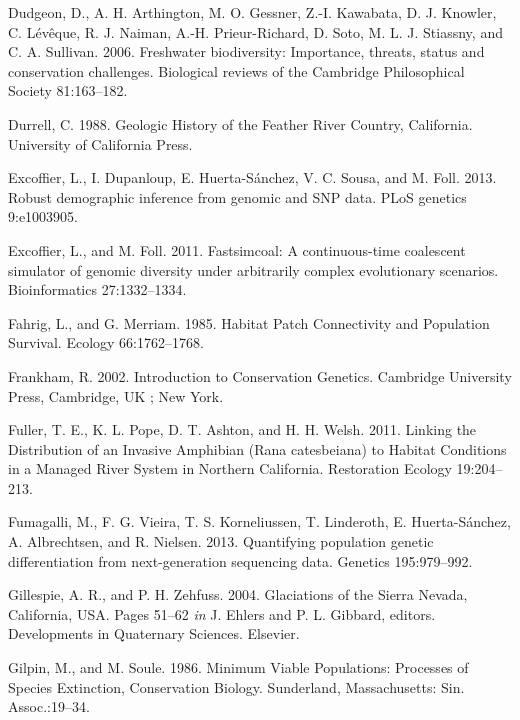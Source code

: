 \documentclass[proquest,12pt,final]{ucthesis-CA2012} %
\begin{document}
\begin{ucmainmatter}
\leavevmode\hypertarget{ref-dudgeon_freshwater_2006}{}%
Dudgeon, D., A. H. Arthington, M. O. Gessner, Z.-I. Kawabata, D. J.
Knowler, C. Lévêque, R. J. Naiman, A.-H. Prieur-Richard, D. Soto, M. L.
J. Stiassny, and C. A. Sullivan. 2006. Freshwater biodiversity:
Importance, threats, status and conservation challenges. Biological
reviews of the Cambridge Philosophical Society 81:163--182.

\leavevmode\hypertarget{ref-durrell_geologic_1988}{}%
Durrell, C. 1988. Geologic History of the Feather River Country,
California. University of California Press.

\leavevmode\hypertarget{ref-excoffier_robust_2013}{}%
Excoffier, L., I. Dupanloup, E. Huerta-Sánchez, V. C. Sousa, and M.
Foll. 2013. Robust demographic inference from genomic and SNP data. PLoS
genetics 9:e1003905.

\leavevmode\hypertarget{ref-excoffier_fastsimcoal_2011}{}%
Excoffier, L., and M. Foll. 2011. Fastsimcoal: A continuous-time
coalescent simulator of genomic diversity under arbitrarily complex
evolutionary scenarios. Bioinformatics 27:1332--1334.

\leavevmode\hypertarget{ref-fahrig_habitat_1985}{}%
Fahrig, L., and G. Merriam. 1985. Habitat Patch Connectivity and
Population Survival. Ecology 66:1762--1768.

\leavevmode\hypertarget{ref-frankham_introduction_2002}{}%
Frankham, R. 2002. Introduction to Conservation Genetics. Cambridge
University Press, Cambridge, UK ; New York.

\leavevmode\hypertarget{ref-fuller_linking_2011}{}%
Fuller, T. E., K. L. Pope, D. T. Ashton, and H. H. Welsh. 2011. Linking
the Distribution of an Invasive Amphibian (Rana catesbeiana) to Habitat
Conditions in a Managed River System in Northern California. Restoration
Ecology 19:204--213.

\leavevmode\hypertarget{ref-fumagalli_quantifying_2013}{}%
Fumagalli, M., F. G. Vieira, T. S. Korneliussen, T. Linderoth, E.
Huerta-Sánchez, A. Albrechtsen, and R. Nielsen. 2013. Quantifying
population genetic differentiation from next-generation sequencing data.
Genetics 195:979--992.

\leavevmode\hypertarget{ref-gillespie_glaciations_2004}{}%
Gillespie, A. R., and P. H. Zehfuss. 2004. Glaciations of the Sierra
Nevada, California, USA. Pages 51--62 \emph{in} J. Ehlers and P. L.
Gibbard, editors. Developments in Quaternary Sciences. Elsevier.

\leavevmode\hypertarget{ref-gilpin_minimum_1986}{}%
Gilpin, M., and M. Soule. 1986. Minimum Viable Populations: Processes of
Species Extinction, Conservation Biology. Sunderland, Massachusetts:
Sin. Assoc.:19--34.


\end{ucmainmatter}
\end{document}
